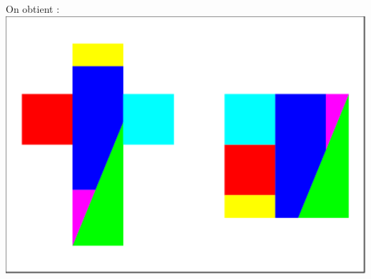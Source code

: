 \documentclass[a4paper,11pt]{book}
\begin{document}
On obtient :\\
\includegraphics[width=\textwidth]{puzzlecroix8}
\end{document}
